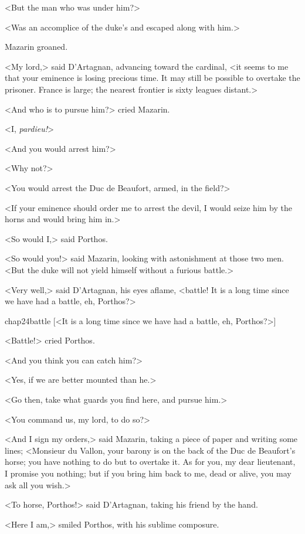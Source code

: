 <But the man who was under him?>

<Was an accomplice of the duke's and escaped along with him.>

Mazarin groaned.

<My lord,> said D'Artagnan, advancing toward the cardinal, <it seems to me that your eminence is losing precious time. It may still be possible to overtake the prisoner. France is large; the nearest frontier is sixty leagues distant.>

<And who is to pursue him?> cried Mazarin.

<I, \textit{pardieu!}>

<And you would arrest him?>

<Why not?>

<You would arrest the Duc de Beaufort, armed, in the field?>

<If your eminence should order me to arrest the devil, I would seize him by the horns and would bring him in.>

<So would I,> said Porthos.

<So would you!> said Mazarin, looking with astonishment at those two men. <But the duke will not yield himself without a furious battle.>

<Very well,> said D'Artagnan, his eyes aflame, <battle! It is a long time since we have had a battle, eh, Porthos?>


\begin{bwbigpic}
	[\basicscale] 
	{chap24battle}
	[<It is a long time since we have had a battle, eh, Porthos?>]
\end{bwbigpic}


<Battle!> cried Porthos.

<And you think you can catch him?>

<Yes, if we are better mounted than he.>

<Go then, take what guards you find here, and pursue him.>

<You command us, my lord, to do so?>

<And I sign my orders,> said Mazarin, taking a piece of paper and writing some lines; <Monsieur du Vallon, your barony is on the back of the Duc de Beaufort's horse; you have nothing to do but to overtake it. As for you, my dear lieutenant, I promise you nothing; but if you bring him back to me, dead or alive, you may ask all you wish.>

<To horse, Porthos!> said D'Artagnan, taking his friend by the hand.

<Here I am,> smiled Porthos, with his sublime composure.


